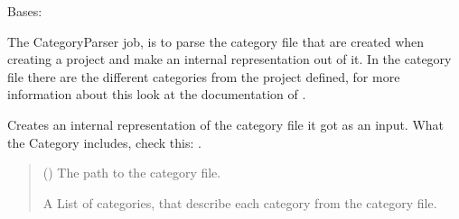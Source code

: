 \documentclass[letterpaper,10pt,english]{sphinxmanual}
\begin{document}
\begin{fulllineitems}
\label{\detokenize{apidoc/src.osm_configurator.model.parser:src.osm_configurator.model.parser.category_parser_interface.CategoryParserInterface}}
\pysigstartsignatures
{}
\pysigstopsignatures
\sphinxAtStartPar
Bases: 

\sphinxAtStartPar
The CategoryParser job, is to parse the category file that are created when creating a project and
make an internal representation out of it.
In the category file there are the different categories from the project defined, for more information about this
look at the documentation of .

\begin{fulllineitems}
\label{\detokenize{apidoc/src.osm_configurator.model.parser:src.osm_configurator.model.parser.category_parser_interface.CategoryParserInterface.parse_category_file}}
\pysigstartsignatures
{}
\pysigstopsignatures
\sphinxAtStartPar
Creates an internal representation of the category file it got as an input.
What the Category includes, check this: .
\begin{quote}\begin{description}
\sphinxAtStartPar
{} () \textendash{} The path to the category file.

\sphinxAtStartPar
A List of categories, that describe each category from the category file.

\sphinxAtStartPar
{}

\end{description}\end{quote}

\end{fulllineitems}


\end{fulllineitems}
\end{document}
